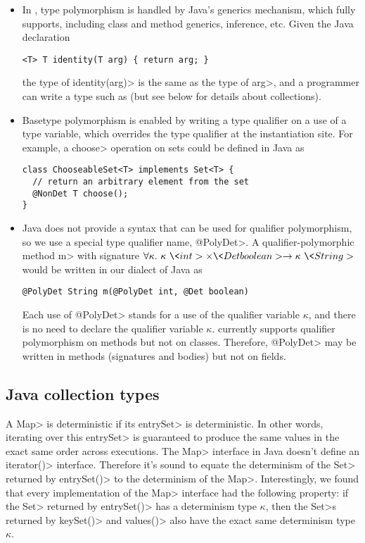 \begin{itemize}
\item
In \theDeterminismCheckerImplementation,
type polymorphism is handled by Java's generics mechanism, which
\theDeterminismChecker fully supports, including class and method generics,
inference, etc.
Given the Java declaration
\begin{Verbatim}
<T> T identity(T arg) { return arg; }
\end{Verbatim}
the type of \<identity(arg)> is the same as the type of
\<arg>, and a programmer can write a type such as  (but see below for details about collections).
\item
Basetype polymorphism is enabled by writing a type qualifier on a use of a
type variable, which overrides the type qualifier at the instantiation
site.
For example, a \<choose> operation on sets could be defined in Java as
\begin{Verbatim}
class ChooseableSet<T> implements Set<T> {
  // return an arbitrary element from the set
  @NonDet T choose();
}
\end{Verbatim}
\item
{}
Java does not provide a syntax that can be used for qualifier polymorphism,
so we use a special type qualifier name, \<@PolyDet>.
A qualifier-polymorphic method \<m> with signature $\forallt{\kappa} \kappa\ \<int> \times \<Det boolean> \rightarrow
\kappa\ \<String>$ would be written in our dialect of Java as
\begin{Verbatim}
@PolyDet String m(@PolyDet int, @Det boolean)
\end{Verbatim}
Each use of \<@PolyDet> stands for a use of the qualifier variable
$\kappa$, and there is no need to declare the qualifier variable $\kappa$.
\TheDeterminismChecker currently supports
qualifier
polymorphism on methods but not on classes.
Therefore, \<@PolyDet> may be written in methods (signatures and bodies)
but not on fields.
\end{itemize}

\subsection{Java collection types}\label{sec:maps-java}

A \<Map> is deterministic if its \<entrySet> is deterministic.
In other words, iterating over this \<entrySet> is guaranteed to produce the same values in the exact same order across executions.
The \<Map> interface in Java doesn't define an \<iterator()> interface. Therefore it's sound to equate the determinism of the \<Set>
returned by \<entrySet()> to the determinism of the \<Map>. Interestingly, we found that every implementation of the \<Map> 
interface had the following property: if the \<Set> returned by \<entrySet()> has a determinism type $\kappa$, then
the \<Set>s returned by \<keySet()> and \<values()> also have the exact same determinism type $\kappa$.

